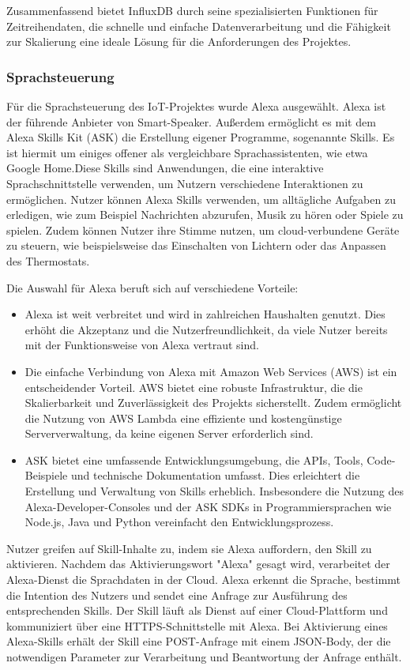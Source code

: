 Zusammenfassend bietet InfluxDB durch seine spezialisierten Funktionen für Zeitreihendaten, die schnelle und einfache Datenverarbeitung und die Fähigkeit zur Skalierung eine ideale Lösung für die Anforderungen des Projektes.

\subsubsection{Sprachsteuerung}
Für die Sprachsteuerung des IoT-Projektes wurde Alexa ausgewählt. Alexa ist der führende Anbieter von Smart-Speaker.\cite{fleck2024smartspeakers} Außerdem ermöglicht es mit dem Alexa Skills Kit (ASK) die Erstellung eigener Programme, sogenannte Skills. Es ist hiermit um einiges offener als vergleichbare Sprachassistenten, wie etwa Google Home.Diese Skills sind Anwendungen, die eine interaktive Sprachschnittstelle verwenden, um Nutzern verschiedene Interaktionen zu ermöglichen. Nutzer können Alexa Skills verwenden, um alltägliche Aufgaben zu erledigen, wie zum Beispiel Nachrichten abzurufen, Musik zu hören oder Spiele zu spielen. Zudem können Nutzer ihre Stimme nutzen, um cloud-verbundene Geräte zu steuern, wie beispielsweise das Einschalten von Lichtern oder das Anpassen des Thermostats.

Die Auswahl für Alexa beruft sich auf verschiedene Vorteile: \cite{amazon2024alexa}
\begin{itemize}
    \item Alexa ist weit verbreitet und wird in zahlreichen Haushalten genutzt. Dies erhöht die Akzeptanz und die Nutzerfreundlichkeit, da viele Nutzer bereits mit der Funktionsweise von Alexa vertraut sind.
    \item Die einfache Verbindung von Alexa mit Amazon Web Services (AWS) ist ein entscheidender Vorteil. AWS bietet eine robuste Infrastruktur, die die Skalierbarkeit und Zuverlässigkeit des Projekts sicherstellt. Zudem ermöglicht die Nutzung von AWS Lambda eine effiziente und kostengünstige Serververwaltung, da keine eigenen Server erforderlich sind.
    \item ASK bietet eine umfassende Entwicklungsumgebung, die APIs, Tools, Code-Beispiele und technische Dokumentation umfasst. Dies erleichtert die Erstellung und Verwaltung von Skills erheblich. Insbesondere die Nutzung des Alexa-Developer-Consoles und der ASK SDKs in Programmiersprachen wie Node.js, Java und Python vereinfacht den Entwicklungsprozess. 
\end{itemize}

Nutzer greifen auf Skill-Inhalte zu, indem sie Alexa auffordern, den Skill zu aktivieren. Nachdem das Aktivierungswort "Alexa" gesagt wird, verarbeitet der Alexa-Dienst die Sprachdaten in der Cloud. Alexa erkennt die Sprache, bestimmt die Intention des Nutzers und sendet eine Anfrage zur Ausführung des entsprechenden Skills. Der Skill läuft als Dienst auf einer Cloud-Plattform und kommuniziert über eine HTTPS-Schnittstelle mit Alexa. Bei Aktivierung eines Alexa-Skills erhält der Skill eine POST-Anfrage mit einem JSON-Body, der die notwendigen Parameter zur Verarbeitung und Beantwortung der Anfrage enthält.

